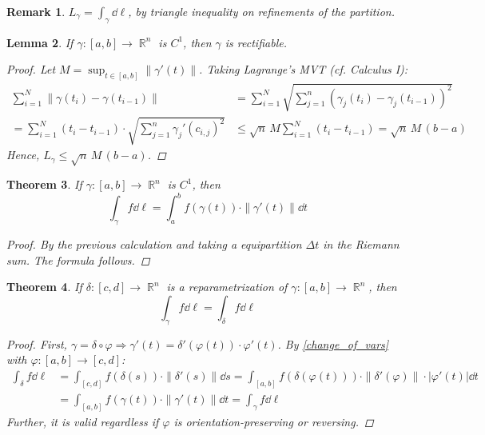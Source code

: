 \documentclass[12pt]{article}
\let\RA\Rightarrow
\DeclareMathOperator{\R}{\mathbb{R}}
\newtheorem{theorem}{Theorem}[subsection]
\newtheorem{lemma}[theorem]{Lemma}
\newtheorem{remark}[theorem]{Remark}
\begin{document}
\begin{remark}
  $L_\gamma=\displaystyle\int_{\gamma}\dd{\ell}$, by triangle inequality on refinements of the partition.
\end{remark}

\begin{lemma}
  If $\gamma:[a,b]\to\R^n$ is $C^1$, then $\gamma$ is rectifiable.
  \begin{proof}
    Let $M=\sup_{t\in[a,b]}\|\gamma'(t)\|$. Taking Lagrange's MVT (cf. Calculus I):
    \begin{align*}
      \sum_{i=1}^N \|\gamma(t_i)-\gamma(t_{i-1})\|&=\sum_{i=1}^N \sqrt{\sum_{j=1}^n(\gamma_j(t_i)-\gamma_j(t_{i-1}))^2}\\
      =\sum_{i=1}^N (t_i-t_{i-1})\cdot\sqrt{\sum_{j=1}^n \gamma_j'(c_{i,j})^2}&\leq \sqrt{n}\,M\sum_{i=1}^N (t_i-t_{i-1})=\sqrt{n}\,M\,(b-a)
    \end{align*}
    Hence, $L_\gamma\leq \sqrt{n}\,M\,(b-a)$.
  \end{proof}
\end{lemma}

\begin{theorem}
  If $\gamma:[a,b]\to\R^n$ is $C^1$, then $$\int_{\gamma} f\dd{\ell}=\int_a^b f(\gamma(t))\cdot\|\gamma'(t)\|\dd{t}$$
  \begin{proof}
    By the previous calculation and taking a equipartition $\Delta t$ in the Riemann sum. The formula follows.
  \end{proof}
\end{theorem}

\begin{theorem}
  If $\delta:[c,d]\to\R^n$ is a reparametrization of $\gamma:[a,b]\to\R^n$, then $$\int_{\gamma} f\dd{\ell}=\int_{\delta} f\dd{\ell}$$
  \begin{proof}
    First, $\gamma=\delta\circ\varphi\RA \gamma'(t)=\delta'(\varphi(t))\cdot\varphi'(t)$. By \ref{change_of_vars} with $\varphi:[a,b]\to[c,d]$:
    \begin{align*}
      \int_{\delta} f\dd{\ell}&=\int_{[c,d]} f(\delta(s))\cdot\|\delta'(s)\|\dd{s}=\int_{[a,b]} f(\delta(\varphi(t)))\cdot\|\delta'(\varphi)\|\cdot|\varphi'(t)|\dd{t}\\
      &=\int_{[a,b]}f(\gamma(t))\cdot\|\gamma'(t)\|\dd{t}=\int_{\gamma} f\dd{\ell}
    \end{align*}
    Further, it is valid regardless if $\varphi$ is orientation-preserving or reversing.
  \end{proof}
\end{theorem}
\end{document}
